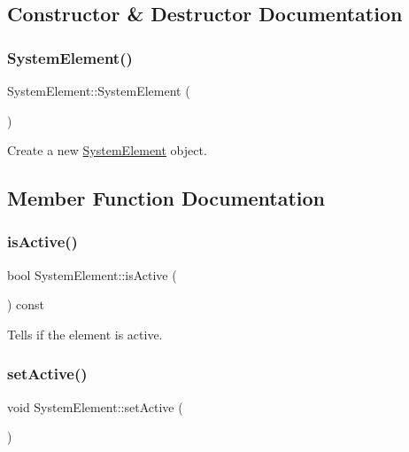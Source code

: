 \subsection{Constructor \& Destructor Documentation}
\mbox{\label{classSystemElement_a212b0b8d05fc08ae3358cbae576e3f39}} 
\subsubsection{\texorpdfstring{System\+Element()}{SystemElement()}}
{\footnotesize\ttfamily System\+Element\+::\+System\+Element (\begin{DoxyParamCaption}{ }\end{DoxyParamCaption})}

Create a new \mbox{\hyperlink{classSystemElement}{System\+Element}} object. 

\subsection{Member Function Documentation}
\mbox{\label{classSystemElement_a50987a52734db127a8ff3574903182d0}} 
\subsubsection{\texorpdfstring{is\+Active()}{isActive()}}
{\footnotesize\ttfamily bool System\+Element\+::is\+Active (\begin{DoxyParamCaption}{ }\end{DoxyParamCaption}) const}

Tells if the element is active. \mbox{\label{classSystemElement_a020e7af72158df06021525b5bb878e92}} 
\subsubsection{\texorpdfstring{set\+Active()}{setActive()}}
{\footnotesize\ttfamily void System\+Element\+::set\+Active (\begin{DoxyParamCaption}{ }\end{DoxyParamCaption})}

